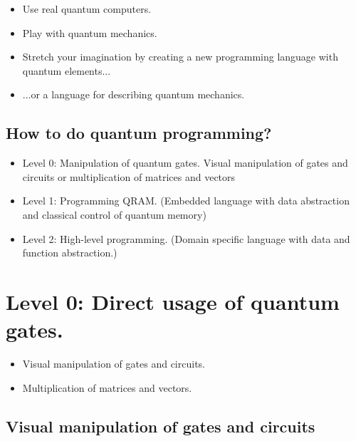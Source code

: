 \documentclass[a4paper,11pt]{article}
\begin{document}
\begin{itemize}
    \item Use real quantum computers. 
    \item Play with quantum mechanics.
    \item Stretch your imagination by creating a new programming 
    language with quantum elements...
    \item ...or a language for describing quantum mechanics.
\end{itemize}

\subsection{How to do quantum programming?}

\begin{itemize}
    \item  Level 0: Manipulation of quantum gates.
    Visual manipulation of gates and circuits or multiplication 
        of matrices and vectors
    
    \item Level 1: Programming QRAM. (Embedded language 
        with data abstraction and classical control of quantum memory)
    
    \item Level 2: High-level programming. (Domain specific 
        language with data and function abstraction.)
\end{itemize}

\section{Level 0: Direct usage of quantum gates.}

\begin{itemize}
\item Visual manipulation of gates and circuits.
\item Multiplication of matrices and vectors.
\end{itemize}

\subsection{Visual manipulation of gates and circuits}
\end{document}
